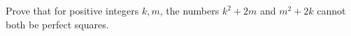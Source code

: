 Prove that for positive integers $k,m$, the numbers $k^2+2m$ and $m^2+2k$ cannot both be perfect squares.
